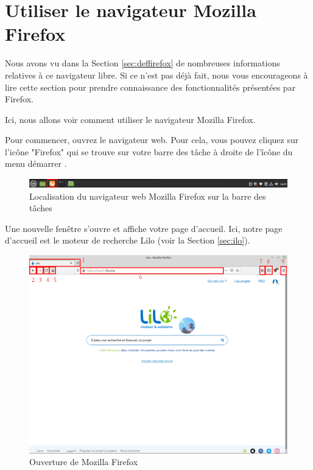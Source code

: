 \documentclass[12pt]{book}
\begin{document}
\section{Utiliser le navigateur Mozilla Firefox}\label{sec:utiliserfirefox}
	Nous avons vu dans la Section \ref{sec:deffirefox} de nombreuses informations relatives à ce navigateur libre.
	Si ce n'est pas déjà fait, nous vous encourageons à lire cette section pour prendre connaissance des fonctionnalités présentées par Firefox.\par
	Ici, nous allons voir comment utiliser le navigateur Mozilla Firefox.\par
	Pour commencer, ouvrez le navigateur web.
	Pour cela, vous pouvez cliquez sur l'icône "Firefox" qui se trouve sur votre barre des tâche à droite de l'îcône du menu démarrer .
	\begin{figure}[h]
		\centering
		\includegraphics[width=\textwidth]{include/mf_barre.png}
		\caption{Localisation du navigateur web Mozilla Firefox sur la barre des tâches}
		\label{fig:mf_barre}
	\end{figure}\par
	Une nouvelle fenêtre s'ouvre et affiche votre page d'accueil.
	Ici, notre page d'accueil est le moteur de recherche Lilo (voir la Section \ref{sec:ilo}).
	\begin{figure}[h]
		\centering
		\includegraphics[width=.9\textwidth]{include/accueil_mf.png}
		\caption{Ouverture de Mozilla Firefox}
		\label{fig:accueil_mf}
	\end{figure}
\end{document}
